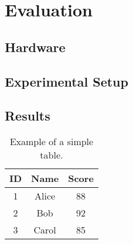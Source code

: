 \chapter{Evaluation}
\label{chap:Evaluation}

\section{Hardware}
\label{sec:Hardware}

\section{Experimental Setup}
\label{sec:Experimental Setup}

\section{Results}
\label{sec:Results}

\begin{table}[htbp]
\centering
\begin{tabular}{|c|c|c|}
\hline
ID & Name & Score \\
\hline
1 & Alice & 88 \\
2 & Bob & 92 \\
3 & Carol & 85 \\
\hline
\end{tabular}
\caption{Example of a simple table.}
\label{eval:table:example}
\end{table}

